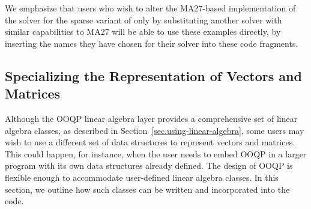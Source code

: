 We emphasize that users who wish to alter the MA27-based
implementation of the solver for the sparse variant of 
only by substituting another solver with similar capabilities to MA27
will be able to use these examples directly, by inserting the names
they have chosen for their solver into these code fragments.

% 

\subsection{Specializing the Representation of Vectors and Matrices}
\label{sec:special.matvec}

Although the OOQP linear algebra layer provides a comprehensive set of
linear algebra classes, as described in
Section~\ref{sec.using-linear-algebra}, some users may wish to
use a different set of data structures to represent vectors and
matrices. This could happen, for instance, when the user needs to
embed OOQP in a larger program with its own data structures already
defined.  The design of OOQP is flexible enough to accommodate
user-defined linear algebra classes. In this section, we outline how
such classes can be written and incorporated into the code.

